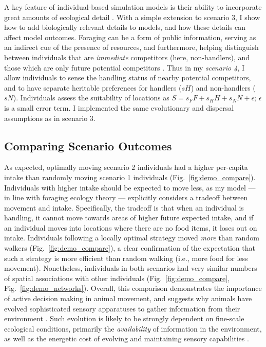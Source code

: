 \begin{interludeenv}
A key feature of individual-based simulation models is their ability to incorporate great amounts of ecological detail \citep{deangelis2019}.
With a simple extension to scenario 3, I show how to add biologically relevant details to models, and how these details can affect model outcomes.
Foraging can be a form of public information, serving as an indirect cue of the presence of resources, and furthermore, helping distinguish between individuals that are \textit{immediate} competitors (here, non-handlers), and those which are only future potential competitors \citep[][; here, handlers]{dall2005,giraldeau2018,beauchamp2008,beauchamp2013}.
Thus in my \textit{scenario 4}, I allow individuals to sense the handling status of nearby potential competitors, and to have separate heritable preferences for handlers ($sH$) and non-handlers ($sN$).
Individuals assess the suitability of locations as $S = s_FF + s_HH + s_NN + \epsilon$; $\epsilon$ is a small error term.
I implemented the same evolutionary and dispersal assumptions as in scenario 3.

\subsection*{Comparing Scenario Outcomes}

As expected, optimally moving scenario 2 individuals had a higher per-capita intake than randomly moving scenario 1 individuals (Fig.~\ref{fig:demo_compare}).
Individuals with higher intake should be expected to move less, as my model --- in line with foraging ecology theory \citep{charnov1976} --- explicitly considers a tradeoff between movement and intake.
Specifically, the tradeoff is that when an individual is handling, it cannot move towards areas of higher future expected intake, and if an individual moves into locations where there are no food items, it loses out on intake.
Individuals following a locally optimal strategy moved \textit{more} than random walkers (Fig.~\ref{fig:demo_compare}), a clear confirmation of the expectation that such a strategy is more efficient than random walking (i.e., more food for less movement).
Nonetheless, individuals in both scenarios had very similar numbers of spatial associations with other individuals (Fig.~\ref{fig:demo_compare}, Fig.~\ref{fig:demo_networks}).
Overall, this comparison demonstrates the importance of active decision making in animal movement, and suggests why animals have evolved sophisticated sensory apparatuses to gather information from their environment \citep{avgar2013,berger2022,mann2021,swain2021}.
Such evolution is likely to be strongly dependent on fine-scale ecological conditions, primarily the \textit{availability} of information in the environment, as well as the energetic cost of evolving and maintaining sensory capabilities \citep{swain2021}.


\end{interludeenv}
